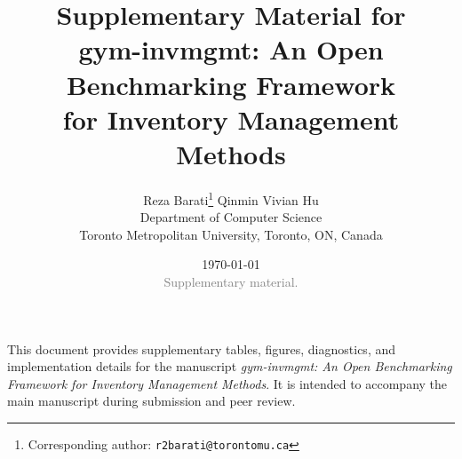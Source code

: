 \documentclass[10pt,a4paper]{article}
\begin{document}
\title{\textbf{Supplementary Material for\\[4pt]
       gym-invmgmt: An Open Benchmarking Framework\\[4pt]
       for Inventory Management Methods}}

\author{%
  Reza Barati\thanks{Corresponding author:
  \texttt{r2barati@torontomu.ca}}
  \quad Qinmin Vivian Hu\\[4pt]
  \small Department of Computer Science\\[-1pt]
  \small Toronto Metropolitan University, Toronto, ON, Canada
}

\date{%
  \small\today\\[4pt]
  \small\textcolor{gray}{Supplementary material.}%
}

\maketitle
\thispagestyle{fancy}

\noindent
This document provides supplementary tables, figures, diagnostics, and
implementation details for the manuscript
\emph{gym-invmgmt: An Open Benchmarking Framework for Inventory Management
Methods}. It is intended to accompany the main manuscript during submission
and peer review.

\setcounter{table}{0}
\setcounter{figure}{0}
\renewcommand{\thetable}{S\arabic{table}}
\renewcommand{\thefigure}{S\arabic{figure}}
\end{document}
